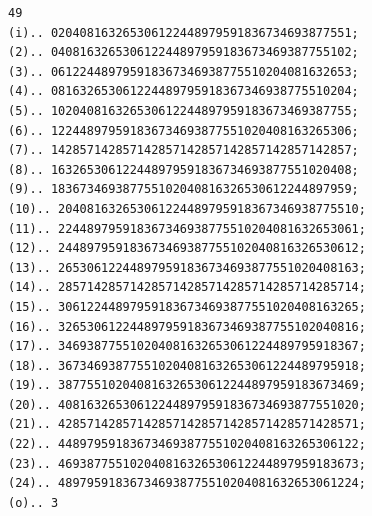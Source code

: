 \documentclass[10pt,a4paper]{article}
\begin{document}
\newpage
\setcounter{page}{417}

\begin{verbatim}
49
(i).. 020408163265306122448979591836734693877551;
(2).. 040816326530612244897959183673469387755102;
(3).. 061224489795918367346938775510204081632653;
(4).. 081632653061224489795918367346938775510204;
(5).. 102040816326530612244897959183673469387755;
(6).. 122448979591836734693877551020408163265306;
(7).. 142857142857142857142857142857142857142857;
(8).. 163265306122448979591836734693877551020408;
(9).. 183673469387755102040816326530612244897959;
(10).. 204081632653061224489795918367346938775510;
(11).. 224489795918367346938775510204081632653061;
(12).. 244897959183673469387755102040816326530612;
(13).. 265306122448979591836734693877551020408163;
(14).. 285714285714285714285714285714285714285714;
(15).. 306122448979591836734693877551020408163265;
(16).. 326530612244897959183673469387755102040816;
(17).. 346938775510204081632653061224489795918367;
(18).. 367346938775510204081632653061224489795918;
(19).. 387755102040816326530612244897959183673469;
(20).. 408163265306122448979591836734693877551020;
(21).. 428571428571428571428571428571428571428571;
(22).. 448979591836734693877551020408163265306122;
(23).. 469387755102040816326530612244897959183673;
(24).. 489795918367346938775510204081632653061224;
(o).. 3
\end{verbatim}

\newpage
\setcounter{page}{418}
\end{document}
